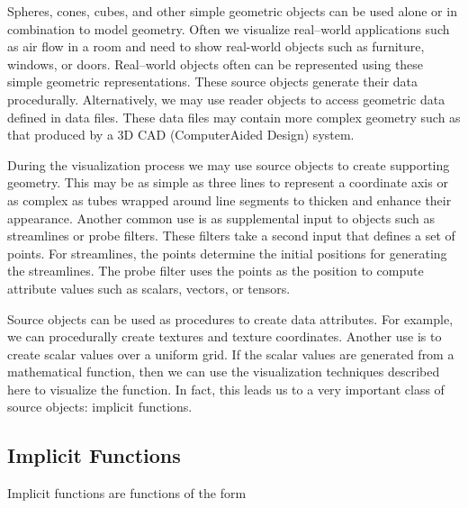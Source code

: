 \begin{description}[leftmargin=0cm,labelindent=0cm]

\item[Modelling Simple Geometry.] Spheres, cones, cubes, and other simple geometric objects can be used alone or in combination to model geometry. Often we visualize real--world applications such as air flow in a room and need to show real-world objects such as furniture, windows, or doors.
Real--world objects often can be represented using these simple geometric representations. These source objects generate their data procedurally. Alternatively, we may use reader objects to access geometric data defined in data files. These data files may contain more complex geometry such as that produced by a 3D CAD (ComputerAided Design) system.

\item[Supporting Geometry.] During the visualization process we may use source objects to create supporting geometry. This may be as simple as three lines to represent a coordinate axis or as complex as tubes wrapped around line segments to thicken and enhance their appearance. Another common use is as supplemental input to objects such as streamlines or probe filters. These filters take a second input that defines a set of points. For streamlines, the points determine the initial positions for generating the streamlines. The probe filter uses the points as the position to compute attribute values such as scalars, vectors, or tensors.

\item[Data Attribute Creation.] Source objects can be used as procedures to create data attributes. For example, we can procedurally create textures and texture coordinates. Another use is to create scalar values over a uniform grid. If the scalar values are generated from a mathematical function, then we can use the visualization techniques described here to visualize the function. In fact, this leads us to a very important class of source objects: implicit functions.

\end{description}

\subsection{Implicit Functions}
\label{subsec:implicit_functions}

Implicit functions are functions of the form

